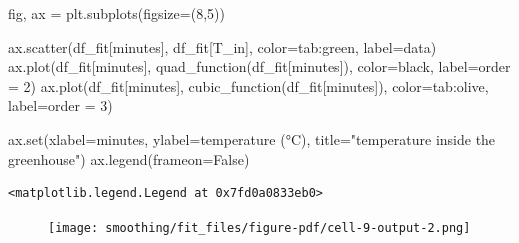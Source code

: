 \documentclass[
  letterpaper,
  DIV=11,
  numbers=noendperiod,
  oneside]{scrreprt}
\newenvironment{Shaded}{\begin{snugshade}}{\end{snugshade}}
\newcommand{\BuiltInTok}[1]{\textcolor[rgb]{0.00,0.23,0.31}{#1}}
\newcommand{\DecValTok}[1]{\textcolor[rgb]{0.68,0.00,0.00}{#1}}
\newcommand{\NormalTok}[1]{\textcolor[rgb]{0.00,0.23,0.31}{#1}}
\newcommand{\OperatorTok}[1]{\textcolor[rgb]{0.37,0.37,0.37}{#1}}
\newcommand{\StringTok}[1]{\textcolor[rgb]{0.13,0.47,0.30}{#1}}
\newcommand{\VariableTok}[1]{\textcolor[rgb]{0.07,0.07,0.07}{#1}}
\begin{document}
\begin{Shaded}
\begin{Highlighting}[]
\NormalTok{fig, ax }\OperatorTok{=}\NormalTok{ plt.subplots(figsize}\OperatorTok{=}\NormalTok{(}\DecValTok{8}\NormalTok{,}\DecValTok{5}\NormalTok{))}

\NormalTok{ax.scatter(df\_fit[}\StringTok{\textquotesingle{}minutes\textquotesingle{}}\NormalTok{], df\_fit[}\StringTok{\textquotesingle{}T\_in\textquotesingle{}}\NormalTok{],}
\NormalTok{           color}\OperatorTok{=}\StringTok{\textquotesingle{}tab:green\textquotesingle{}}\NormalTok{, label}\OperatorTok{=}\StringTok{\textquotesingle{}data\textquotesingle{}}\NormalTok{)}
\NormalTok{ax.plot(df\_fit[}\StringTok{\textquotesingle{}minutes\textquotesingle{}}\NormalTok{], quad\_function(df\_fit[}\StringTok{\textquotesingle{}minutes\textquotesingle{}}\NormalTok{]),}
\NormalTok{        color}\OperatorTok{=}\StringTok{\textquotesingle{}black\textquotesingle{}}\NormalTok{, label}\OperatorTok{=}\StringTok{\textquotesingle{}order = 2\textquotesingle{}}\NormalTok{)}
\NormalTok{ax.plot(df\_fit[}\StringTok{\textquotesingle{}minutes\textquotesingle{}}\NormalTok{], cubic\_function(df\_fit[}\StringTok{\textquotesingle{}minutes\textquotesingle{}}\NormalTok{]),}
\NormalTok{        color}\OperatorTok{=}\StringTok{\textquotesingle{}tab:olive\textquotesingle{}}\NormalTok{, label}\OperatorTok{=}\StringTok{\textquotesingle{}order = 3\textquotesingle{}}\NormalTok{)}

\NormalTok{ax.}\BuiltInTok{set}\NormalTok{(xlabel}\OperatorTok{=}\StringTok{\textquotesingle{}minutes\textquotesingle{}}\NormalTok{,}
\NormalTok{       ylabel}\OperatorTok{=}\StringTok{\textquotesingle{}temperature (°C)\textquotesingle{}}\NormalTok{,}
\NormalTok{       title}\OperatorTok{=}\StringTok{"temperature inside the greenhouse"}\NormalTok{)}
\NormalTok{ax.legend(frameon}\OperatorTok{=}\VariableTok{False}\NormalTok{)}
\end{Highlighting}
\end{Shaded}

\begin{verbatim}
<matplotlib.legend.Legend at 0x7fd0a0833eb0>
\end{verbatim}

\begin{figure}[H]

{\centering \texttt{[image: smoothing/fit\_files/figure-pdf/cell-9-output-2.png]}

}

\end{figure}
\end{document}
